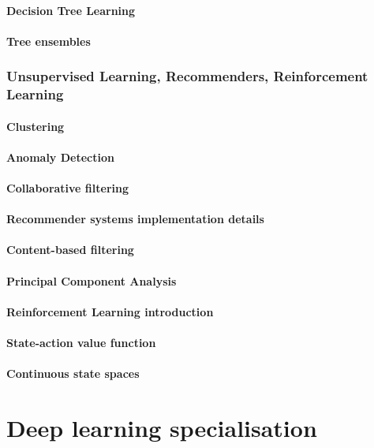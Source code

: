 \documentclass[a4paper, 11pt]{book}
\begin{document}
    \subsection{Decision Tree Learning}
    \subsection{Tree ensembles}

    \section{Unsupervised Learning, Recommenders, Reinforcement Learning}
    \subsection{Clustering}
    \subsection{Anomaly Detection}
    \subsection{Collaborative filtering}
    \subsection{Recommender systems implementation details}
    \subsection{Content-based filtering}
    \subsection{Principal Component Analysis}
    \subsection{Reinforcement Learning introduction}
    \subsection{State-action value function}
    \subsection{Continuous state spaces}

    \part{Deep learning specialisation}
\end{document}
